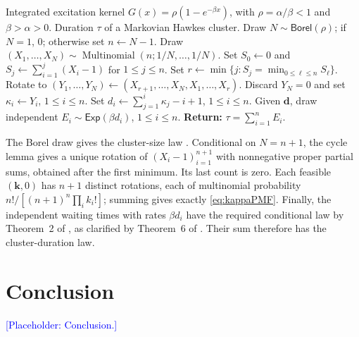 \documentclass[stsy,dblanonrev]{amers/INFORMS-STSY-Template-26-02-2026/informs4}
\newcommand{\placeholder}[1]{\par\noindent\textcolor{blue}{[Placeholder: #1]}\par}
\begin{document}
\begin{algorithm}[H]
\caption{Exact Simulation of Markovian Hawkes Cluster Duration}\label{alg:duration}
\begin{algorithmic}[1]
\Require Integrated excitation kernel $G(x)=\rho(1-e^{-\beta x})$, with
$\rho=\alpha/\beta<1$ and $\beta>\alpha>0$.
\Ensure Duration $\tau$ of a Markovian Hawkes cluster.
\State Draw $N\sim\mathsf{Borel}(\rho)$; if $N=1$, \Return $0$; otherwise set $n\gets N-1$.
\State Draw $(X_1,\ldots,X_N)\sim\operatorname{Multinomial}(n;1/N,\ldots,1/N)$.
\State Set $S_0\gets0$ and $S_j\gets\sum_{i=1}^j(X_i-1)$ for $1\leq j\leq n$.
\State Set $r\gets\min\{j:S_j=\min_{0\leq\ell\leq n}S_\ell\}$.
\State Rotate to $(Y_1,\ldots,Y_N)\gets(X_{r+1},\ldots,X_N,X_1,\ldots,X_r)$.
\State Discard $Y_N=0$ and set $\kappa_i\gets Y_i$, $1\leq i\leq n$.
\State Set $d_i\gets\sum_{j=1}^i\kappa_j-i+1$, $1\leq i\leq n$.
\State Given $\mathbf d$, draw independent $E_i\sim\mathsf{Exp}(\beta d_i)$, $1\leq i\leq n$. 
\Statex \hspace*{-\algorithmicindent} \textbf{Return:} $\tau = \sum_{i=1}^n E_i$.\end{algorithmic}
\end{algorithm}

The Borel draw gives the cluster-size law \citep{hawkes1974cluster}. Conditional on $N=n+1$, the cycle lemma \citep[Corollary~14.4]{janson2012simply} gives a unique rotation of $(X_i-1)_{i=1}^{n+1}$ with nonnegative proper partial sums, obtained after the first minimum. Its last count is zero. Each feasible $(\mathbf k,0)$ has $n+1$ distinct rotations, each of multinomial probability $n!/[(n+1)^n\prod_i k_i!]$; summing gives exactly \eqref{eq:kappaPMF}. Finally, the independent waiting times with rates $\beta d_i$ have the required conditional law by Theorem~2 of \citet{daw2023conditional}, as clarified by Theorem~6 of \citet{daw2024asymmetries}. Their sum therefore has the cluster-duration law.
\hfill\Halmos\endproof

\FloatBarrier
\section{Conclusion}\label{sec:conclusion}
\placeholder{Conclusion.}
\end{document}
